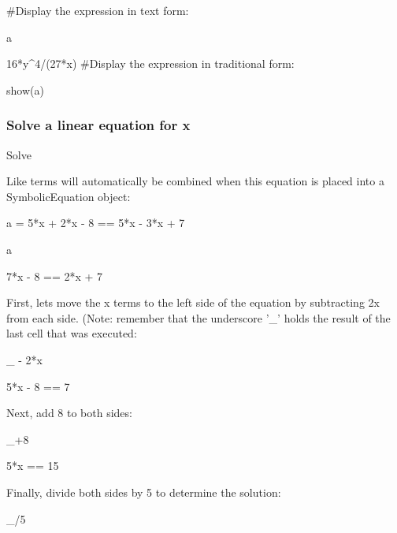 \documentclass[12pt,oneside]{book}
\begin{document}
\#Display the expression in text form:

a

{\textbar}

16*y\^{}4/(27*x)
\#Display the expression in traditional form:

show(a)

{\textbar}

 

 


\subsubsection[Solve a linear equation for x]{Solve a linear equation for x}

Solve 


{\textquotedbl}{\textquotedbl}{\textquotedbl}

Like terms will automatically be combined when this equation is placed into a SymbolicEquation object:

{\textquotedbl}{\textquotedbl}{\textquotedbl}

a = 5*x + 2*x {}- 8 == 5*x {}- 3*x + 7

a

{\textbar}

7*x {}- 8 == 2*x + 7

{\textquotedbl}{\textquotedbl}{\textquotedbl}

First, lets move the x terms to the left side of the equation by subtracting 2x from each side. (Note: remember that the underscore '\_' holds the result of the last cell that was executed:

{\textquotedbl}{\textquotedbl}{\textquotedbl}

\_ {}- 2*x

{\textbar}

5*x {}- 8 == 7

{\textquotedbl}{\textquotedbl}{\textquotedbl}

Next, add 8 to both sides:

{\textquotedbl}{\textquotedbl}{\textquotedbl}

\_+8

{\textbar}

5*x == 15

{\textquotedbl}{\textquotedbl}{\textquotedbl}

Finally, divide both sides by 5 to determine the solution:

{\textquotedbl}{\textquotedbl}{\textquotedbl}

\_/5
\end{document}
